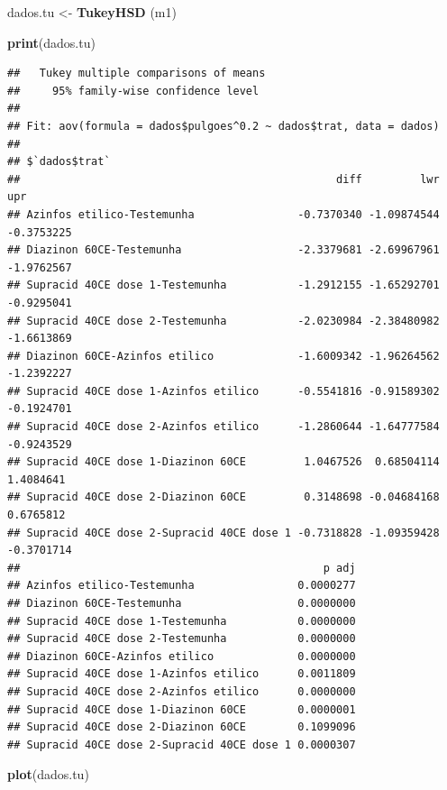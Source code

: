 \documentclass[
]{book}
\newenvironment{Shaded}{\begin{snugshade}}{\end{snugshade}}
\newcommand{\KeywordTok}[1]{\textcolor[rgb]{0.13,0.29,0.53}{\textbf{#1}}}
\newcommand{\NormalTok}[1]{#1}
\newcommand{\StringTok}[1]{\textcolor[rgb]{0.31,0.60,0.02}{#1}}
\begin{document}
\begin{Shaded}
\begin{Highlighting}[]
\NormalTok{dados.tu <-}\StringTok{ }\KeywordTok{TukeyHSD}\NormalTok{ (m1)}
\end{Highlighting}
\end{Shaded}

\begin{Shaded}
\begin{Highlighting}[]
\KeywordTok{print}\NormalTok{(dados.tu)}
\end{Highlighting}
\end{Shaded}

\begin{verbatim}
##   Tukey multiple comparisons of means
##     95% family-wise confidence level
## 
## Fit: aov(formula = dados$pulgoes^0.2 ~ dados$trat, data = dados)
## 
## $`dados$trat`
##                                                 diff         lwr        upr
## Azinfos etilico-Testemunha                -0.7370340 -1.09874544 -0.3753225
## Diazinon 60CE-Testemunha                  -2.3379681 -2.69967961 -1.9762567
## Supracid 40CE dose 1-Testemunha           -1.2912155 -1.65292701 -0.9295041
## Supracid 40CE dose 2-Testemunha           -2.0230984 -2.38480982 -1.6613869
## Diazinon 60CE-Azinfos etilico             -1.6009342 -1.96264562 -1.2392227
## Supracid 40CE dose 1-Azinfos etilico      -0.5541816 -0.91589302 -0.1924701
## Supracid 40CE dose 2-Azinfos etilico      -1.2860644 -1.64777584 -0.9243529
## Supracid 40CE dose 1-Diazinon 60CE         1.0467526  0.68504114  1.4084641
## Supracid 40CE dose 2-Diazinon 60CE         0.3148698 -0.04684168  0.6765812
## Supracid 40CE dose 2-Supracid 40CE dose 1 -0.7318828 -1.09359428 -0.3701714
##                                               p adj
## Azinfos etilico-Testemunha                0.0000277
## Diazinon 60CE-Testemunha                  0.0000000
## Supracid 40CE dose 1-Testemunha           0.0000000
## Supracid 40CE dose 2-Testemunha           0.0000000
## Diazinon 60CE-Azinfos etilico             0.0000000
## Supracid 40CE dose 1-Azinfos etilico      0.0011809
## Supracid 40CE dose 2-Azinfos etilico      0.0000000
## Supracid 40CE dose 1-Diazinon 60CE        0.0000001
## Supracid 40CE dose 2-Diazinon 60CE        0.1099096
## Supracid 40CE dose 2-Supracid 40CE dose 1 0.0000307
\end{verbatim}

\begin{Shaded}
\begin{Highlighting}[]
\KeywordTok{plot}\NormalTok{(dados.tu)}
\end{Highlighting}
\end{Shaded}
\end{document}
